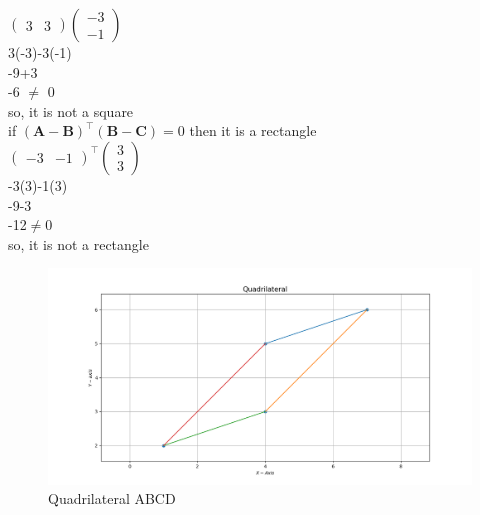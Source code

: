 \documentclass[10pt]{article}
\newcommand{\myvec}[1]{\ensuremath{\begin{pmatrix}#1\end{pmatrix}}}
\providecommand{\brak}[1]{\ensuremath{\left(#1\right)}}
\let\vec\mathbf
\begin{document}
\begin{enumerate}
$\myvec{3&3}{\myvec{-3\\-1}}$\\

3(-3)-3(-1)\\

-9+3\\

-6 $\neq$ 0\\

so, it is not a square\\

if $\brak{\vec{A}-\vec{B}}^{\top}\brak{\vec{B}-\vec{C}}=0$ then it is a rectangle\\

$\myvec{-3&-1}^{\top}{\myvec{3\\3}}$\\

-3(3)-1(3)\\

-9-3\\

-12$\neq$0\\

so, it is not a rectangle\\ 
\begin{figure}[H]
			\centering
			\includegraphics[width=\columnwidth]{figs/Figure_1}
			\caption{Quadrilateral ABCD}
			\label{fig:1}
		\end{figure}

\end{enumerate}
\end{document}
